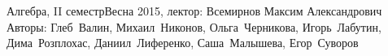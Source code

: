 


\BigHeader
	{Алгебра, II семестр}{Весна 2015, лектор: Всемирнов Максим Александрович}
	{Авторы: Глеб~Валин, Михаил~Никонов, Ольга~Черникова, Игорь~Лабутин, Дима~Розплохас, Даниил~Лиференко, Саша~Малышева, Егор~Суворов}



























